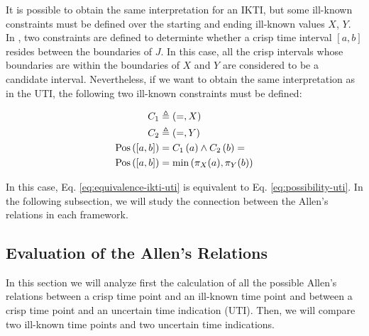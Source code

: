 It is possible to obtain the same interpretation for an IKTI, but some ill-known constraints must be defined over the starting and ending ill-known values $X$, $Y$. In \cite{Pons2011}, two constraints are defined to determinte whether a crisp time interval $[a, b]$ resides between the boundaries of $J$. In this case, all the crisp intervals whose boundaries are within the boundaries of $X$ and $Y$ are considered to be a candidate interval. Nevertheless, if we want to obtain the same interpretation as in the UTI, the following two ill-known constraints must be defined:

\begin{align}
 \label{eq:ikc-ikti-uti}
C_1 &\triangleq \left(=, X \right) \\
C_2 &\triangleq \left(=, Y \right)\\
\operatorname{Pos} \left(\left[a, b\right] \right) &= C_1 \left(a \right) \wedge C_2\left(b \right) =\\
\label{eq:equivalence-ikti-uti}
\operatorname{Pos} \left(\left[a, b\right] \right) &= \min \left( \pi_X(a), \pi_Y(b) \right)
\end{align}

In this case, Eq. \eqref{eq:equivalence-ikti-uti} is equivalent to Eq. \eqref{eq:possibility-uti}.
In the following subsection, we will study the connection between the Allen's relations in each framework.

\subsection{\label{subsec:eval-allen-relations}Evaluation of the Allen's Relations}


 




In this section we will analyze first the calculation of all the possible Allen's relations between a crisp time point and an ill-known time point and between a crisp time point and an uncertain time indication (UTI). Then, we will compare two ill-known time points and two uncertain time indications.

